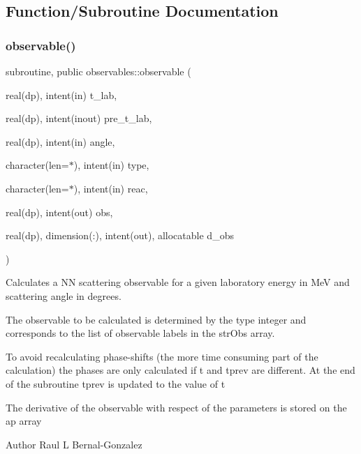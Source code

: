 \subsection{Function/\+Subroutine Documentation}
\mbox{\label{namespaceobservables_a82a92bf8aed4802ad0e9d4203e1e4314}} 
\subsubsection{\texorpdfstring{observable()}{observable()}}
{\footnotesize\ttfamily subroutine, public observables\+::observable (\begin{DoxyParamCaption}\item[{real(dp), intent(in)}]{t\+\_\+lab,  }\item[{real(dp), intent(inout)}]{pre\+\_\+t\+\_\+lab,  }\item[{real(dp), intent(in)}]{angle,  }\item[{character(len=$\ast$), intent(in)}]{type,  }\item[{character(len=$\ast$), intent(in)}]{reac,  }\item[{real(dp), intent(out)}]{obs,  }\item[{real(dp), dimension(\+:), intent(out), allocatable}]{d\+\_\+obs }\end{DoxyParamCaption})}



Calculates a NN scattering observable for a given laboratory energy in MeV and scattering angle in degrees. 

The observable to be calculated is determined by the type integer and corresponds to the list of observable labels in the str\+Obs array.

To avoid recalculating phase-\/shifts (the more time consuming part of the calculation) the phases are only calculated if t and tprev are different. At the end of the subroutine tprev is updated to the value of t

The derivative of the observable with respect of the parameters is stored on the ap array

\begin{DoxyAuthor}{Author}
Raul L Bernal-\/\+Gonzalez
\end{DoxyAuthor}

